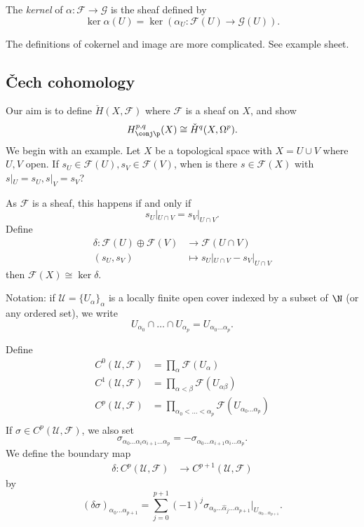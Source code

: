 \documentclass[a4paper]{article}
\begin{document}
\begin{definition}
  The \emph{kernel} of \(\alpha: \mathcal F \to \mathcal G\) is the sheaf defined by
  \[
    \ker \alpha(U) = \ker (\alpha_U: \mathcal F(U) \to \mathcal G(U)).
  \]
\end{definition}

The definitions of cokernel and image are more complicated. See example sheet.

\subsection{Čech cohomology}

Our aim is to define \(\check H(X, \mathcal F)\) where \(\mathcal F\) is a sheaf on \(X\), and show
\[
  H_{\conj \p}^{p, q}(X) \cong \check H^q(X, \Omega^p).
\]
We begin with an example. Let \(X\) be a topological space with \(X = U \cup V\) where \(U, V\) open. If \(s_U \in \mathcal F(U), s_V \in \mathcal F(V)\), when is there \(s \in \mathcal F(X)\) with \(s|_U = s_U, s|_V = s_V\)?

As \(\mathcal F\) is a sheaf, this happens if and only if
\[
  s_U|_{U \cap V} = s_V|_{U \cap V}.
\]
Define
\begin{align*}
  \delta: \mathcal F(U) \oplus \mathcal F(V) &\to \mathcal F(U \cap V) \\
  (s_U, s_V) &\mapsto s_U|_{U \cap V} - s_V|_{U \cap V}
\end{align*}
then \(\mathcal F(X) \cong \ker \delta\).

\begin{notation}
  Notation: if \(\mathcal U = \{U_\alpha\}_\alpha\) is a locally finite open cover indexed by a subset of \(\N\) (or any ordered set), we write
  \[
    U_{\alpha_0} \cap \dots \cap U_{\alpha_p} = U_{\alpha_0 \dots \alpha_p}.
  \]
\end{notation}

Define
\begin{align*}
  C^0(\mathcal U, \mathcal F) &= \prod_\alpha \mathcal F(U_\alpha) \\
  C^1(\mathcal U, \mathcal F) &= \prod_{\alpha < \beta} \mathcal F(U_{\alpha\beta}) \\
  C^p(\mathcal U, \mathcal F) &= \prod_{\alpha_0 < \dots < \alpha_p} \mathcal F(U_{\alpha_0 \dots \alpha_p}) \\
\end{align*}
If \(\sigma \in C^p(\mathcal U, \mathcal F)\), we also set
\[
  \sigma_{\alpha_0 \dots \alpha_i \alpha_{i + 1} \dots \alpha_p} = - \sigma_{\alpha_0 \dots \alpha_{i + 1} \alpha_i \dots \alpha_p}.
\]
We define the boundary map
\begin{align*}
  \delta: C^p(\mathcal U, \mathcal F) &\to C^{p + 1}(\mathcal U, \mathcal F)
\end{align*}
by
\[
  (\delta\sigma)_{\alpha_0 \dots \alpha_{p + 1}} = \sum_{j = 0}^{p + 1} (-1)^j \sigma_{\alpha_0 \dots \hat \alpha_j \dots \alpha_{p + 1}} |_{U_{\alpha_0 \dots \alpha_{p + 1}}}.
\]
\end{document}
